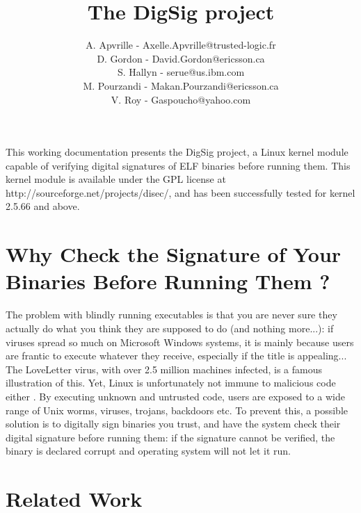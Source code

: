 \documentclass{article}
\begin{document}

\pagestyle{empty}


\title{\Large \bf The DigSig project}

\author{
A. Apvrille - {\normalsize Axelle.Apvrille@trusted-logic.fr}\\
D. Gordon - {\normalsize David.Gordon@ericsson.ca}\\
S. Hallyn - {\normalsize serue@us.ibm.com}\\
M. Pourzandi - {\normalsize Makan.Pourzandi@ericsson.ca}\\
V. Roy - {\normalsize Gaspoucho@yahoo.com}\\
} %

\maketitle


This working documentation presents the DigSig project, 
a Linux kernel module capable of verifying
digital signatures of ELF binaries before running them. This kernel
module is available under the GPL license at 
http://sourceforge.net/projects/disec/, and has been successfully
tested for kernel 2.5.66 and above.

\section{Why Check the Signature of Your Binaries Before Running Them ?}

The problem with blindly running executables is that you are never
sure they actually do what you think they are supposed to do (and
nothing more...): if viruses spread so much on Microsoft Windows
systems, it is mainly because users are frantic to execute whatever
they receive, especially if the title is appealing... The LoveLetter
virus, with over 2.5 million machines infected, is a famous
illustration of this.  Yet, Linux is unfortunately not immune to
malicious code either \cite{linux-world}. By executing unknown and untrusted code,
users are exposed to a wide range of Unix worms, viruses, trojans,
backdoors etc.  To prevent this, a possible solution is to digitally
sign binaries you trust, and have the system check their digital
signature before running them: if the signature cannot be verified, the
binary is declared corrupt and operating system will not let it run.

\section{Related Work} 
\end{document}
